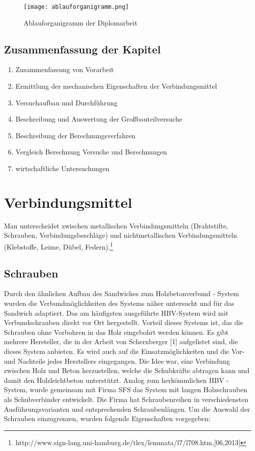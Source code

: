 \documentclass[12 pt,a4 paper ]{scrreprt}
\begin{document}
\begin{figure}[h]
\begin{center}
\texttt{[image: ablauforganigramm.png]}
\caption{Ablauforganigramm der Diplomarbeit}
\end{center}
\end{figure}




\section{Zusammenfassung der Kapitel}

\begin{enumerate}
\item Zusammenfassung von Vorarbeit 
\item Ermittlung der mechanischen Eigenschaften der Verbindungsmittel
\item Versuchaufbau und Durchführung
\item Beschreibung und Auswertung der Großbauteilversuche
\item Beschreibung der Berechnungsverfahren
\item Vergleich Berechnung Versuche und Berechnungen
\item wirtschaftliche Untersuchungen

\end{enumerate}




\chapter{Verbindungsmittel}

Man unterscheidet zwischen metallischen Verbindungsmitteln (Drahtstifte, Schrauben, Verbindungsbeschläge) und nichtmetallischen Verbindungsmitteln (Klebstoffe, Leime, Dübel, Federn).\footnote{http://www.sign-lang.uni-hamburg.de/tlex/lemmata/l7/l708.htm,[06,2013]}



\section{Schrauben}

Durch den ähnlichen Aufbau des Sandwiches zum Holzbetonverbund - System wurden die Verbundmöglichkeiten des Systems näher untersucht und für das Sandwich adaptiert. Das am häufigsten ausgeführte HBV-System wird mit Verbundschrauben direkt vor Ort hergestellt. Vorteil dieses Systems ist, das die Schrauben ohne Vorbohren in das Holz eingebohrt werden können. Es gibt mehrere Hersteller, die in der Arbeit von Schernberger [1] aufgelistet sind, die dieses System anbieten. Es wird auch auf die Einsatzmöglichkeiten und die Vor- und Nachteile jedes Herstellers eingegangen. 
Die Idee war, eine Verbindung zwischen Holz und Beton herzustellen, welche die Schubkräfte abtragen kann und damit den Holzleichtbeton unterstützt. Analog zum herkömmlichen HBV - System, wurde gemeinsam mit Firma SFS das System mit langen Holzschrauben als Schubverbinder entwickelt. Die Firma hat Schraubenreihen  in verschiedensten Ausführungsvarianten und entsprechenden Schraubenlängen. Um die Auswahl der Schrauben einzugrenzen, wurden folgende Eigenschaften vorgegeben:
\end{document}
